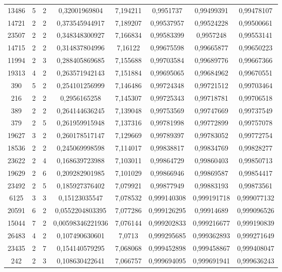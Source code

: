 \begin{longtable}{|c|c|c|c|c|c|c|c|}
13486 & 5 & 2 & 0,32001969804 & 7,194211 & 0,9951737 & 0,99499391 & 0,99478107 \\
14721 & 2 & 2 & 0,373545944917 & 7,189207 & 0,99537957 & 0,99524228 & 0,99500661 \\
23507 & 2 & 2 & 0,348348300927 & 7,166834 & 0,99583399 & 0,9957248 & 0,99553141 \\
14715 & 2 & 2 & 0,314837804996 & 7,16122 & 0,99675598 & 0,99665877 & 0,99650223 \\
11994 & 2 & 3 & 0,288405869685 & 7,155688 & 0,99703584 & 0,99689776 & 0,99667366 \\
19313 & 4 & 2 & 0,263571942143 & 7,151884 & 0,99695065 & 0,99684962 & 0,99670551 \\
390 & 5 & 2 & 0,254101256999 & 7,146486 & 0,99724348 & 0,99721512 & 0,99703464 \\
216 & 2 & 2 & 0,2956165258 & 7,145307 & 0,99725343 & 0,99718781 & 0,99706518 \\
389 & 2 & 2 & 0,264144636245 & 7,139048 & 0,99753569 & 0,99747669 & 0,99737549 \\
379 & 2 & 5 & 0,261959915948 & 7,137316 & 0,99781998 & 0,99772899 & 0,99757078 \\
19627 & 3 & 2 & 0,260178517147 & 7,129669 & 0,99789397 & 0,99783052 & 0,99772754 \\
18536 & 2 & 2 & 0,245069998598 & 7,114017 & 0,99838817 & 0,99834769 & 0,99828277 \\
23622 & 2 & 4 & 0,168639723988 & 7,103011 & 0,99864729 & 0,99860403 & 0,99850713 \\
19629 & 2 & 6 & 0,209282901985 & 7,101029 & 0,99866946 & 0,99869587 & 0,99854417 \\
23492 & 2 & 5 & 0,185927376402 & 7,079921 & 0,99877949 & 0,99883193 & 0,99873561 \\
6125 & 3 & 3 & 0,15123035547 & 7,078532 & 0,999140308 & 0,999191718 & 0,999077132 \\
20591 & 6 & 2 & 0,0552204803395 & 7,077286 & 0,999126295 & 0,99914689 & 0,999096526 \\
15044 & 7 & 2 & 0,00598346221936 & 7,076144 & 0,999202833 & 0,999216677 & 0,999190839 \\
26483 & 4 & 2 & 0,107490630601 & 7,0713 & 0,999295685 & 0,999362893 & 0,999271649 \\
23435 & 2 & 7 & 0,154140579295 & 7,068068 & 0,999452898 & 0,999458867 & 0,999408047 \\
242 & 2 & 3 & 0,108630422641 & 7,066757 & 0,999694095 & 0,999691941 & 0,999636243 \\

\end{longtable}
